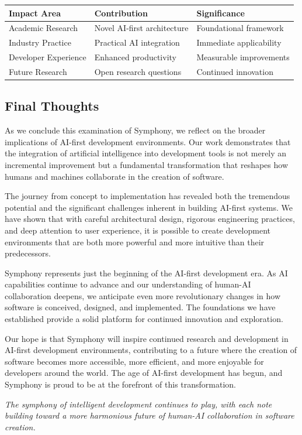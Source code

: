 \begin{center}
\begin{tabular}{@{}lll@{}}
\toprule
\textbf{Impact Area} & \textbf{Contribution} & \textbf{Significance} \\
\midrule
Academic Research & Novel AI-first architecture & Foundational framework \\
Industry Practice & Practical AI integration & Immediate applicability \\
Developer Experience & Enhanced productivity & Measurable improvements \\
Future Research & Open research questions & Continued innovation \\
\bottomrule
\end{tabular}
\end{center}

\subsection*{Final Thoughts}

As we conclude this examination of Symphony, we reflect on the broader implications of AI-first development environments. Our work demonstrates that the integration of artificial intelligence into development tools is not merely an incremental improvement but a fundamental transformation that reshapes how humans and machines collaborate in the creation of software.

The journey from concept to implementation has revealed both the tremendous potential and the significant challenges inherent in building AI-first systems. We have shown that with careful architectural design, rigorous engineering practices, and deep attention to user experience, it is possible to create development environments that are both more powerful and more intuitive than their predecessors.

\begin{infobox}[title=Looking Forward]
Symphony represents just the beginning of the AI-first development era. As AI capabilities continue to advance and our understanding of human-AI collaboration deepens, we anticipate even more revolutionary changes in how software is conceived, designed, and implemented. The foundations we have established provide a solid platform for continued innovation and exploration.
\end{infobox}

Our hope is that Symphony will inspire continued research and development in AI-first development environments, contributing to a future where the creation of software becomes more accessible, more efficient, and more enjoyable for developers around the world. The age of AI-first development has begun, and Symphony is proud to be at the forefront of this transformation.

\vspace{1cm}

\begin{center}
\textit{The symphony of intelligent development continues to play, with each note building toward a more harmonious future of human-AI collaboration in software creation.}
\end{center}
